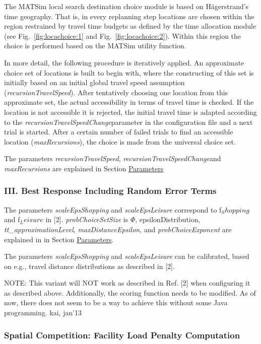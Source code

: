 The MATSim local search destination choice module is  based on Hägerstrand's time geography. That is, in every replanning step  locations are chosen within the region restrained by travel time  budgets as defined by the time allocation module (see Fig.~\ref{fig:locachoice:1} and Fig.~\ref{fig:locachoice:2}). Within this region the choice is performed based on the MATSim utility function.

In more detail, the following procedure is  iteratively applied. An approximate choice set of locations is built to  begin with, where the constructing of this set is initially based on an  initial global travel speed assumption (\emph{recursionTravelSpeed}).  After tentatively choosing one location from this approximate set, the  actual accessibility in terms of travel time is checked. If the location  is not accessible it is rejected, the initial travel time is adapted  according to the \emph{recursionTravelSpeedChange}parameter  in the configuration file and a next trial is started. After a certain  number of failed trials to find an accessible location (\emph{maxRecursions}), the choice is made from the universal choice set.

The parameters \emph{recursionTravelSpeed}, \emph{recursionTravelSpeedChange}and \emph{maxRecursions }are explained in Section \hyperlink{parameters}{Parameters}


\subsubsection{{III. Best Response Including Random Error Terms}}

The parameters \emph{scaleEpsShopping }and \emph{scaleEpsLeisure }correspond to f$_Shopping$ and f$_Leisure$ in [2]. \emph{probChoiceSetSize }is $\Phi$, epsilonDistribution, \emph{tt\_}\emph{approximationLevel}, \emph{maxDistanceEpsilon}, and \emph{probChoiceExponent }are explained in in Section \hyperlink{parameters}{Parameters}.

The parameters \emph{scaleEpsShopping }and \emph{scaleEpsLeisure }can be calibrated, based on e.g., travel distance distributions as described in [2].

NOTE: This  variant will NOT work as described in Ref. [2] when configuring it as  described above. Additionally, the scoring function needs to be  modified. As of now, there does not seem to be a way to achieve  this without some Java programming. kai, jan'13

\subsubsection{{Spatial Competition: Facility Load Penalty Computation}}


